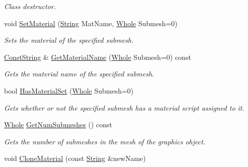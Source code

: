 \begin{DoxyCompactItemize}
\begin{DoxyCompactList}\small\item\em Class destructor. \item\end{DoxyCompactList}\item 
void \hyperlink{classphys_1_1ActorGraphicsSettings_a8954153fe516ddf4e0107348c3af5abc}{SetMaterial} (\hyperlink{namespacephys_aa03900411993de7fbfec4789bc1d392e}{String} MatName, \hyperlink{namespacephys_a460f6bc24c8dd347b05e0366ae34f34a}{Whole} Submesh=0)
\begin{DoxyCompactList}\small\item\em Sets the material of the specified submesh. \item\end{DoxyCompactList}\item 
\hyperlink{namespacephys_a5ce5049f8b4bf88d6413c47b504ebb31}{ConstString} \& \hyperlink{classphys_1_1ActorGraphicsSettings_aa1d57793e97d280acac5a8c8fe8b4cc3}{GetMaterialName} (\hyperlink{namespacephys_a460f6bc24c8dd347b05e0366ae34f34a}{Whole} Submesh=0) const 
\begin{DoxyCompactList}\small\item\em Gets the material name of the specified submesh. \item\end{DoxyCompactList}\item 
bool \hyperlink{classphys_1_1ActorGraphicsSettings_a7b1948300461014e30e8a295917ae886}{HasMaterialSet} (\hyperlink{namespacephys_a460f6bc24c8dd347b05e0366ae34f34a}{Whole} Submesh=0)
\begin{DoxyCompactList}\small\item\em Gets whether or not the specified submesh has a material script assigned to it. \item\end{DoxyCompactList}\item 
\hyperlink{namespacephys_a460f6bc24c8dd347b05e0366ae34f34a}{Whole} \hyperlink{classphys_1_1ActorGraphicsSettings_a550bd94bc063ce629e4c9aa511dbfb79}{GetNumSubmeshes} () const 
\begin{DoxyCompactList}\small\item\em Gets the number of submeshes in the mesh of the graphics ohject. \item\end{DoxyCompactList}\item 
void \hyperlink{classphys_1_1ActorGraphicsSettings_a82baed53d2390cba593b30d6da064f66}{CloneMaterial} (const \hyperlink{namespacephys_aa03900411993de7fbfec4789bc1d392e}{String} \&newName)

\end{DoxyCompactItemize}
